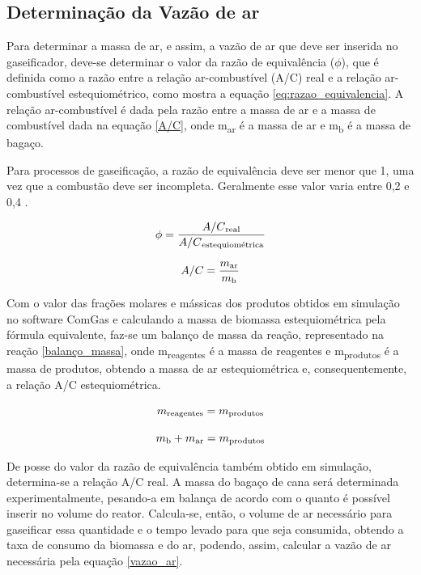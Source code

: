 \subsection{Determinação da Vazão de ar}
Para determinar a massa de ar, e assim, a vazão de ar que deve ser inserida no gaseificador, deve-se determinar o valor da razão de equivalência ($\phi$), que é definida como a razão entre a relação ar-combustível (A/C) real e a relação ar-combustível estequiométrico, como mostra a equação \ref{eq:razao_equivalencia}. A relação ar-combustível é dada pela razão entre a massa de ar e a massa de combustível dada na equação \ref{A/C}, onde m\textsubscript{ar} é a massa de ar e m\textsubscript{b} é a massa de bagaço.

Para processos de gaseificação, a razão de equivalência deve ser menor que 1, uma vez que a combustão deve ser incompleta. Geralmente esse valor varia entre 0,2 e 0,4 \cite{narvaez1996}.
 
\begin{equation}\label{eq:razao_equivalencia}
\phi = \frac{A/C\textsubscript{real}}{A/C\textsubscript{estequiométrica}}
\end{equation}
 
\begin{equation}\label{A/C}
A/C = \frac{m\textsubscript{ar}}{m\textsubscript{b}}
\end{equation}


Com o valor das frações molares e mássicas dos produtos obtidos em simulação no software ComGas e calculando a massa de biomassa estequiométrica pela fórmula equivalente, faz-se um balanço de massa da reação, representado na reação \ref{balanço_massa}, onde m\textsubscript{reagentes} é a massa de reagentes e m\textsubscript{produtos} é a massa de produtos, obtendo a massa de ar estequiométrica e, consequentemente, a relação A/C estequiométrica.


\begin{equation}\label{balanço_massa}
m\textsubscript{reagentes} = m\textsubscript{produtos}
\end{equation}

\begin{equation}\label{balanço_ar}
m\textsubscript{b} + m\textsubscript{ar} = m\textsubscript{produtos}
\end{equation}

De posse do valor da razão de equivalência também obtido em simulação, determina-se a relação A/C real. A massa do bagaço de cana será determinada experimentalmente, pesando-a em balança de acordo com o quanto é possível inserir no volume do reator. Calcula-se, então, o volume de ar necessário para gaseificar essa quantidade e o tempo levado para que seja consumida, obtendo a taxa de consumo da biomassa e do ar, podendo, assim, calcular a vazão de ar necessária pela equação \ref{vazao_ar}.

